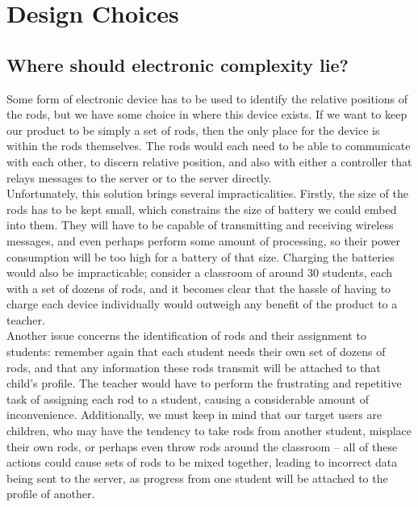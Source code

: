 \chapter{Design Choices}


\section{Where should electronic complexity lie?}
\label{sec:complexity}

Some form of electronic device has to be used to identify the relative positions of the rods, but we have some choice in where this device exists. If we want to keep our product to be simply a set of rods, then the only place for the device is within the rods themselves. The rods would each need to be able to communicate with each other, to discern relative position, and also with either a controller that relays messages to the server or to the server directly.\\

Unfortunately, this solution brings several impracticalities. Firstly, the size of the rods has to be kept small, which constrains the size of battery we could embed into them. They will have to be capable of transmitting and receiving wireless messages, and even perhaps perform some amount of processing, so their power consumption will be too high for a battery of that size. Charging the batteries would also be impracticable; consider a classroom of around 30 students, each with a set of dozens of rods, and it becomes clear that the hassle of having to charge each device individually would outweigh any benefit of the product to a teacher.\\

Another issue concerns the identification of rods and their assignment to students: remember again that each student needs their own set of dozens of rods, and that any information these rods transmit will be attached to that child’s profile. The teacher would have to perform the frustrating and repetitive task of assigning each rod to a student, causing a considerable amount of inconvenience. Additionally, we must keep in mind that our target users are children, who may have the tendency to take rods from another student, misplace their own rods, or perhaps even throw rods around the classroom – all of these actions could cause sets of rods to be mixed together, leading to incorrect data being sent to the server, as progress from one student will be attached to the profile of another.\\

